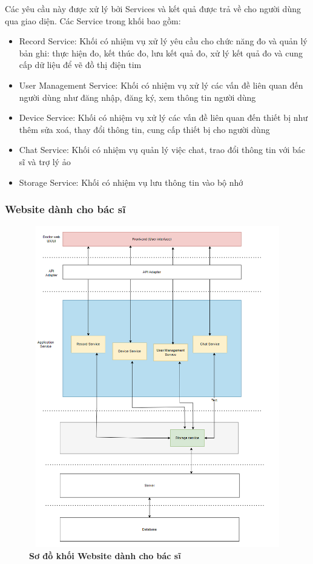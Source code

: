 Các yêu cầu này được xử lý bởi Services và kết quả được trả về cho người dùng qua giao diện. Các Service trong khối bao gồm:
\begin{adjustwidth}{1.5em}{}
\begin{itemize}
  \item Record Service: Khối có nhiệm vụ xử lý yêu cầu cho chức năng đo và quản lý bản ghi: thực hiện đo, kết thúc đo, lưu kết quả đo, xử lý kết quả đo và cung cấp dữ liệu để vẽ đồ thị điện tim
  \item User Management Service: Khối có nhiệm vụ xử lý các vấn đề liên quan đến người dùng như đăng nhập, đăng ký, xem thông tin người dùng
  \item Device Service: Khối có nhiệm vụ xử lý các vấn đề liên quan đến thiết bị như thêm sửa xoá, thay đổi thông tin, cung cấp thiết bị cho người dùng
  \item Chat Service: Khối có nhiệm vụ quản lý việc chat, trao đổi thông tin với bác sĩ và trợ lý ảo
  \item Storage Service: Khối có nhiệm vụ lưu thông tin vào bộ nhớ
\end{itemize}
\end{adjustwidth}


\subsubsection{Website dành cho bác sĩ}

\begin{figure}[H]
  \centering
  \includegraphics[width=12cm,height=14cm]{Images/system/fmECG_architecture-Doctors.drawio.png}
  \caption[Sơ đồ khối Website dành cho bác sĩ]{\bfseries \fontsize{12pt}{0pt}\selectfont Sơ đồ khối Website dành cho bác sĩ}
  \label{fmECG_architecture-Doctors} %
\end{figure}

